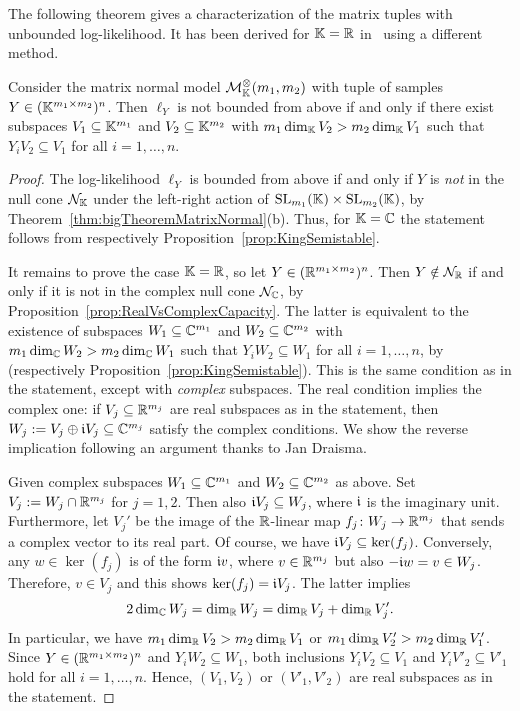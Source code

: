 The following theorem gives a characterization of the matrix tuples with unbounded log-likelihood.
It has been derived for $\mathbb K = \mathbb R$ in~\cite[Theorems 3.1(i) and 3.3(i)]{DrtonKurikiHoff} using a different method. 

\begin{theorem}
	\label{thm:nullconeLeftRight}
	Consider the matrix normal model $\mathcal{M}^{\otimes}_{\mathbb{K}}(m_1,m_2)$ with tuple of samples $Y \in (\mathbb K^{m_1 \times m_2})^n$.
	Then $\ell_Y$ is not bounded from above if and only if
	there exist subspaces $V_1 \subseteq \mathbb K^{m_1}$ and $V_2 \subseteq \mathbb K^{m_2}$ with
	$m_1 \dim_{\mathbb K} V_2 > m_2 \dim_{\mathbb K} V_1$
	such that
	$Y_i V_2 \subseteq V_1$ for all $i = 1, \ldots, n$.
\end{theorem}

\begin{proof}	
	The log-likelihood $\ell_Y$ is bounded from above if and only if $Y$ is \emph{not} in the null cone $\mathcal{N}_\mathbb K$ under the left-right action of $\operatorname{SL}_{m_1}(\mathbb K) \times \operatorname{SL}_{m_2}(\mathbb K)$, by Theorem~\ref{thm:bigTheoremMatrixNormal}(b). Thus, for $\mathbb K = \mathbb C$ the statement follows from \cite[Theorem 2.1]{BurginDraisma} respectively Proposition~\ref{prop:KingSemistable}.
	
	It remains to prove the case $\mathbb K = \mathbb R$, so let $Y \in (\mathbb R^{m_1 \times m_2})^n$. Then $Y \notin \mathcal{N}_{\mathbb R}$ if and only if it is not in the complex null cone $\mathcal{N}_{\mathbb C}$, by Proposition~\ref{prop:RealVsComplexCapacity}.
	The latter is equivalent to the existence of subspaces $W_1 \subseteq \mathbb C^{m_1}$ and $W_2 \subseteq \mathbb C^{m_2}$ with $m_1 \dim_\mathbb C W_2 > m_2 \dim_\mathbb C W_1$ such that $Y_i W_2 \subseteq W_1$ for all $i=1,\ldots,n$, by \cite[Theorem 2.1]{BurginDraisma} (respectively Proposition~\ref{prop:KingSemistable}). 
	This is the same condition as in the statement, except with \emph{complex} subspaces. 
	The real condition implies the complex one: if $V_j \subseteq \mathbb R^{m_j}$ are real subspaces as in the statement, then $W_j := V_j \oplus \mathfrak{i} V_j \subseteq \mathbb C^{m_j}$ satisfy the complex conditions.
	We show the reverse implication following an argument thanks to Jan Draisma.
	
	Given complex subspaces $W_1 \subseteq \mathbb C^{m_1}$ and $W_2 \subseteq \mathbb C^{m_2}$ as above. Set $V_j := W_j \cap \mathbb R^{m_j}$ for $j = 1,2$. Then also $\mathfrak{i} V_j \subseteq W_j$, where $\mathfrak{i}$ is the imaginary unit. Furthermore, let $V_j'$ be the image of the $\mathbb R$-linear map $f_j \colon W_j \to \mathbb R^{m_j}$ that sends a complex vector to its real part. Of course, we have $\mathfrak{i} V_j \subseteq \ker(f_j)$. Conversely, any $w \in \ker(f_j)$ is of the form $\mathfrak{i} v$, where $v \in \mathbb R^{m_j}$ but also $-\mathfrak{i} w = v \in W_j$. Therefore, $v \in V_j$ and this shows $\ker(f_j) = \mathfrak{i} V_j$.
	The latter implies
		\[ 2 \dim_\mathbb C W_j = \dim_\mathbb R W_j = \dim_\mathbb R V_j + \dim_\mathbb R V'_j . \]
	In particular, we have $m_1 \dim_\mathbb R V_2 > m_2 \dim_\mathbb R V_1$ or $m_1 \dim_\mathbb R V'_2 > m_2 \dim_\mathbb R V'_1$.
	Since $Y \in (\mathbb R^{m_1 \times m_2})^n$ and $Y_i W_2 \subseteq W_1$, both inclusions $Y_i V_2 \subseteq V_1$ and $Y_i V'_2 \subseteq V'_1$ hold for all $i=1, \ldots, n$. Hence, $(V_1, V_2)$ or $(V'_1, V'_2)$ are real subspaces  as in the statement.
\end{proof}

